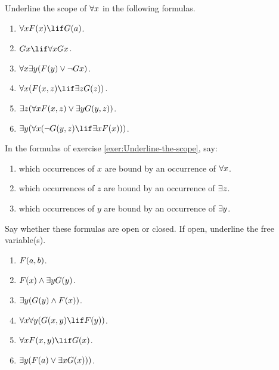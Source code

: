\documentclass[../../../../include/open-logic-section]{subfiles}
\begin{document}


\begin{prob}[Scope]
Underline the scope of $\lforall x$ in the following
formulas.\label{exer:Underline-the-scope}
\begin{enumerate}
\item $\lforall x\Atom{F}{x}\lif \Atom{G}{a}$. 
\item $Gx\lif\lforall xGx$. 
\item $\lforall x\lexists y(\Atom{F}{y}\lor\lnot Gx)$. 
\item $\lforall x(\Atom{F}{x,z}\lif\lexists z\Atom{G}{z})$. 
\item $\lexists z(\lforall x\Atom{F}{x,z}\lor\lexists y\Atom{G}{y,z})$. 
\item $\lexists y(\lforall x(\lnot \Atom{G}{y,z}\lif\lexists x\Atom{F}{x}))$. 
\end{enumerate}
\end{prob}

\begin{prob}[Binding]
In the formulas of exercise \ref{exer:Underline-the-scope},
say:
\begin{enumerate}
\item which occurrences of $x$ are bound by an occurrence of $\lforall x$. 
\item which occurrences of $z$ are bound by an occurrence of $\lexists z$. 
\item which occurrences of $y$ are bound by an occurrence of $\lexists y$. 
\end{enumerate}
\end{prob}

\begin{prob}
Say whether these formulas are open
or closed. If open, underline the free variable(s).
\begin{enumerate}
\item $\mathord{F}(a,b)$. 
\item $\Atom{F}{x}\land\lexists y\Atom{G}{y}$. 
\item $\lexists y(\Atom{G}{y}\land \Atom{F}{x})$. 
\item $\lforall x\lforall y(\Atom{G}{x,y}\lif \Atom{F}{y})$. 
\item $\lforall x\Atom{F}{x,y}\lif \Atom{G}{x}$. 
\item $\lexists y(\Atom{F}{a}\lor\lexists x\Atom{G}{x}))$.
\end{enumerate}
\end{prob}
\end{document}
